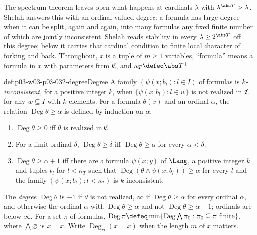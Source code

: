 The spectrum theorem leaves open what happens at cardinals \(\lambda\) with
\(\lambda^{\abs T}>\lambda\).  Shelah answers this with an ordinal-valued
degree: a formula has large degree when it can be split, again and again,
into many formulas any fixed finite number of which are jointly
inconsistent.  Shelah reads stability in every \(\lambda\geq2^{\abs T}\) off
this degree; below it carries that cardinal condition to finite local
character of forking and back.  Throughout,
\(x\) is a tuple of \(m\geq1\) variables, ``formula'' means a formula in
\(x\) with parameters from \(\mathfrak C\), and \(\kappa_T\defeq\abs T^+\).

\begin{hbdefinition}{def:p03-w03-p03-032-degree}{Degree}
A family \((\psi(x;b_l):l\in I)\) of formulas is \emph{\(k\)-inconsistent},
for a positive integer \(k\), when \(\{\psi(x;b_l):l\in w\}\) is not
realized in \(\mathfrak C\) for any \(w\subseteq I\) with \(k\) elements.
For a formula \(\theta(x)\) and an ordinal \(\alpha\), the relation
\(\operatorname{Deg}\theta\geq\alpha\) is defined by induction on
\(\alpha\).
\begin{enumerate}
  \item \(\operatorname{Deg}\theta\geq0\) iff \(\theta\) is realized in
        \(\mathfrak C\).
  \item For a limit ordinal \(\delta\), \(\operatorname{Deg}\theta\geq\delta\)
        iff \(\operatorname{Deg}\theta\geq\alpha\) for every \(\alpha<\delta\).
  \item \(\operatorname{Deg}\theta\geq\alpha+1\) iff there are a formula
        \(\psi(x;y)\) of \(\Lang\), a positive integer \(k\) and tuples
        \(b_l\) for \(l<\kappa_T\) such that
        \(\operatorname{Deg}(\theta\wedge\psi(x;b_l))\geq\alpha\) for every
        \(l\) and the family \((\psi(x;b_l):l<\kappa_T)\) is
        \(k\)-inconsistent.
\end{enumerate}
The \emph{degree} \(\operatorname{Deg}\theta\) is \(-1\) if \(\theta\) is
not realized, \(\infty\) if \(\operatorname{Deg}\theta\geq\alpha\) for every
ordinal \(\alpha\), and otherwise the ordinal \(\alpha\) with
\(\operatorname{Deg}\theta\geq\alpha\) and not
\(\operatorname{Deg}\theta\geq\alpha+1\); ordinals are below \(\infty\).
For a set \(\pi\) of formulas,
\(\operatorname{Deg}\pi\defeq\min\{\operatorname{Deg}\bigwedge\pi_0:
\pi_0\subseteq\pi\text{ finite}\}\), where \(\bigwedge\varnothing\) is
\(x=x\).  Write \(\operatorname{Deg}_m(x=x)\) when the length \(m\) of \(x\)
matters.
\end{hbdefinition}

